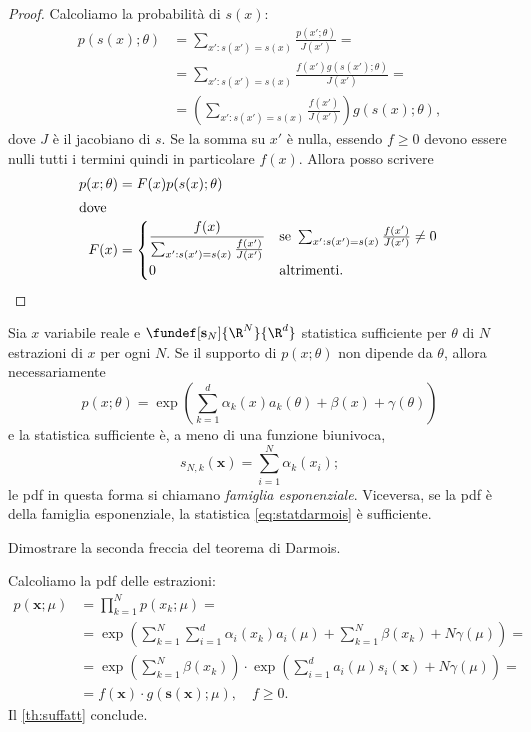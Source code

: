 \begin{proof}
	Calcoliamo la probabilità di $s(x)$:
	\begin{align*}
		p(s(x);\theta)
		&= \sum_{x':s(x')=s(x)} \frac{p(x';\theta)}{J(x')} = \\
		&= \sum_{x':s(x')=s(x)} \frac{f(x') g(s(x');\theta)}{J(x')} = \\
		&= \left( \sum_{x':s(x')=s(x)} \frac{f(x')}{J(x')} \right) g(s(x);\theta),
	\end{align*}
	dove $J$ è il jacobiano di $s$.
	Se la somma su $x'$ è nulla,
	essendo $f\ge 0$ devono essere nulli tutti i termini quindi in particolare $f(x)$.
	Allora posso scrivere
	\begin{align*}
		p(x;\theta)
		&= F(x) p(s(x);\theta) \\
		\intertext{dove}
		F(x)
		&= \begin{cases}
			\displaystyle\frac{f(x)}{\sum_{x':s(x')=s(x)} \frac{f(x')}{J(x')}}
			& \text{se }\sum_{x':s(x')=s(x)} \frac{f(x')}{J(x')} \neq 0 \\
			0 & \text{altrimenti.}
		\end{cases} \qedhere
	\end{align*}
\end{proof}

\begin{fact}
	\label{th:darmois}
	Sia $x$ variabile reale e $\fundef[\mathbf s_N]{\R^N}{\R^d}$ statistica sufficiente per $\theta$ di $N$ estrazioni di $x$ per ogni $N$.
	Se il supporto di $p(x;\theta)$ non dipende da $\theta$, allora necessariamente
	\begin{equation*}
		p(x;\theta) =
		\exp \left( \sum_{k=1}^d \alpha_k(x)a_k(\theta) + \beta(x) + \gamma(\theta) \right)
	\end{equation*}
	e la statistica sufficiente è, a meno di una funzione biunivoca,
	\begin{equation}
		\label{eq:statdarmois}
		s_{N,k}(\mathbf x) = \sum_{i=1}^{N} \alpha_k(x_i);
	\end{equation}
	le pdf in questa forma si chiamano \emph{famiglia esponenziale}.
	Viceversa, se la pdf è della famiglia esponenziale, la statistica \eqref{eq:statdarmois} è sufficiente.
\end{fact}

\begin{exercise}
	Dimostrare la seconda freccia del teorema di Darmois.
\end{exercise}

\begin{solution}
	Calcoliamo la pdf delle estrazioni:
	\begin{align*}
		p(\mathbf x;\mu)
		&= \prod_{k=1}^N p(x_k;\mu) = \\
		&= \exp \left( \sum_{k=1}^N \sum_{i=1}^d \alpha_i(x_k)a_i(\mu)
		+ \sum_{k=1}^N \beta(x_k) + N\gamma(\mu) \right) = \\
		&= \exp \left( \sum_{k=1}^N \beta(x_k) \right)
		\cdot \exp \left( \sum_{i=1}^d a_i(\mu)s_i(\mathbf x) + N\gamma(\mu) \right) = \\
		&= f(\mathbf x) \cdot g(\mathbf s(\mathbf x);\mu), \quad f\ge0.
	\end{align*}
	Il \autoref{th:suffatt} conclude.
\end{solution}
